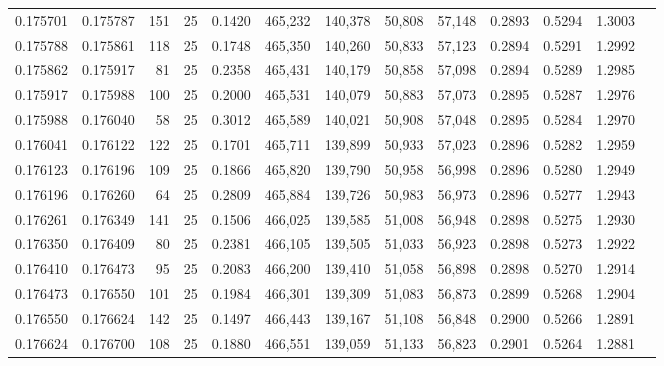 \begin{tabular}{rrrrrrrrrrrrr}
0.175701 & 0.175787 &   151 &  25 &                                     0.1420 & 465,232 & 140,378 &  50,808 &  57,148 & 0.2893 & 0.5294 & 1.3003 \\
0.175788 & 0.175861 &   118 &  25 &                                     0.1748 & 465,350 & 140,260 &  50,833 &  57,123 & 0.2894 & 0.5291 & 1.2992 \\
0.175862 & 0.175917 &    81 &  25 &                                     0.2358 & 465,431 & 140,179 &  50,858 &  57,098 & 0.2894 & 0.5289 & 1.2985 \\
0.175917 & 0.175988 &   100 &  25 &                                     0.2000 & 465,531 & 140,079 &  50,883 &  57,073 & 0.2895 & 0.5287 & 1.2976 \\
0.175988 & 0.176040 &    58 &  25 &                                     0.3012 & 465,589 & 140,021 &  50,908 &  57,048 & 0.2895 & 0.5284 & 1.2970 \\
0.176041 & 0.176122 &   122 &  25 &                                     0.1701 & 465,711 & 139,899 &  50,933 &  57,023 & 0.2896 & 0.5282 & 1.2959 \\
0.176123 & 0.176196 &   109 &  25 &                                     0.1866 & 465,820 & 139,790 &  50,958 &  56,998 & 0.2896 & 0.5280 & 1.2949 \\
0.176196 & 0.176260 &    64 &  25 &                                     0.2809 & 465,884 & 139,726 &  50,983 &  56,973 & 0.2896 & 0.5277 & 1.2943 \\
0.176261 & 0.176349 &   141 &  25 &                                     0.1506 & 466,025 & 139,585 &  51,008 &  56,948 & 0.2898 & 0.5275 & 1.2930 \\
0.176350 & 0.176409 &    80 &  25 &                                     0.2381 & 466,105 & 139,505 &  51,033 &  56,923 & 0.2898 & 0.5273 & 1.2922 \\
0.176410 & 0.176473 &    95 &  25 &                                     0.2083 & 466,200 & 139,410 &  51,058 &  56,898 & 0.2898 & 0.5270 & 1.2914 \\
0.176473 & 0.176550 &   101 &  25 &                                     0.1984 & 466,301 & 139,309 &  51,083 &  56,873 & 0.2899 & 0.5268 & 1.2904 \\
0.176550 & 0.176624 &   142 &  25 &                                     0.1497 & 466,443 & 139,167 &  51,108 &  56,848 & 0.2900 & 0.5266 & 1.2891 \\
0.176624 & 0.176700 &   108 &  25 &                                     0.1880 & 466,551 & 139,059 &  51,133 &  56,823 & 0.2901 & 0.5264 & 1.2881 \\

\end{tabular}
